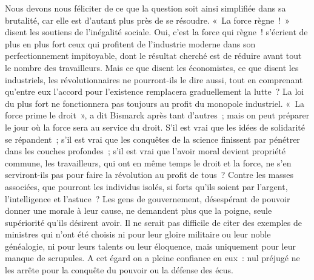 \documentclass[french,twoside]{book} %
\begin{document}
Nous devons nous féliciter de ce que la question soit ainsi simplifiée dans sa brutalité, car elle est d’autant plus près  de se résoudre. « La force règne ! » disent les soutiens de l’inégalité sociale. Oui, c’est la force qui règne ! s’écrient de plus en plus fort ceux qui profitent de l’industrie moderne dans son perfectionnement impitoyable, dont le résultat cherché est de réduire avant tout le nombre des travailleurs. Mais ce que disent les économistes, ce que disent les industriels, les révolutionnaires ne pourront-ils le dire aussi, tout en comprenant qu’entre eux l’accord pour l’existence remplacera graduellement la lutte ? La loi du plus fort ne fonctionnera pas toujours au profit du monopole industriel. « La force prime le droit », a dit Bismarck après tant d’autres ; mais on peut préparer le jour où la force sera au service du droit. S’il est vrai que  les idées de solidarité se répandent ; s’il est vrai que les conquêtes de la science finissent par pénétrer dans les couches profondes ; s’il est vrai que l’avoir moral devient propriété commune, les travailleurs, qui ont en même temps le droit et la force, ne s’en serviront-ils pas pour faire la révolution au profit de tous ? Contre les masses associées, que pourront les individus isolés, si forts qu’ils soient par l’argent, l’intelligence et l’astuce ? Les gens de gouvernement, désespérant de pouvoir donner une morale à leur cause, ne demandent plus que la poigne, seule supériorité qu’ils désirent avoir. Il ne serait pas difficile de citer des exemples de ministres qui n’ont été choisis ni pour leur gloire militaire ou leur noble généalogie, ni pour  leurs talents ou leur éloquence, mais uniquement pour leur manque de scrupules. A cet égard on a pleine confiance en eux : nul préjugé ne les arrête pour la conquête du pouvoir ou la défense des écus.\par
\end{document}
